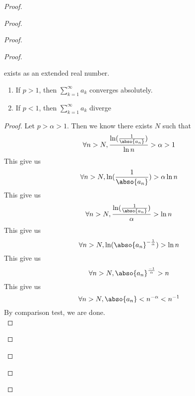 \documentclass{report}
\begin{document}
\begin{proof}
\begin{proof}
\begin{proof}
\begin{proof}
\begin{question}{}{}
\begin{enumerate}
\[    \]
    exists as an extended real number.
    \begin{enumerate}
        \item If \( p > 1 \), then \(\sum_{k=1}^{\infty} a_k\) converges absolutely.
        \item If \( p < 1 \), then $\sum _{k=1}^\infty a_k$ diverge
    \end{enumerate}
\end{enumerate}
\end{question}
\begin{proof}
Let $p>\alpha >1$.  Then we know there exists $N$ such that
 \begin{equation*}
\forall n>N, \frac{\ln (\frac{1}{\abso{a_n}})}{\ln n}>\alpha >1
\end{equation*}
This give us
\begin{equation*}
\forall n>N, \ln(\frac{1}{\abso{a_n}})>\alpha \ln n 
\end{equation*}
This give us
\begin{equation*}
\forall n>N, \frac{\ln (\frac{1}{\abso{a_n}})}{\alpha }>\ln n
\end{equation*}
This give us
\begin{equation*}
\forall n>N, \ln (\abso{a_n}^{-\frac{1}{\alpha }})>\ln n
\end{equation*}
This give us
\begin{equation*}
\forall n>N, \abso{a_n}^{\frac{-1}{\alpha }}>n
\end{equation*}
This give us
\begin{equation*}
\forall n>N, \abso{a_n}<n^{-\alpha }<n^{-1}
\end{equation*}
By comparison test, we are done.\\


\end{proof}
\end{proof}
\end{proof}
\end{proof}
\end{proof}
\end{document}
